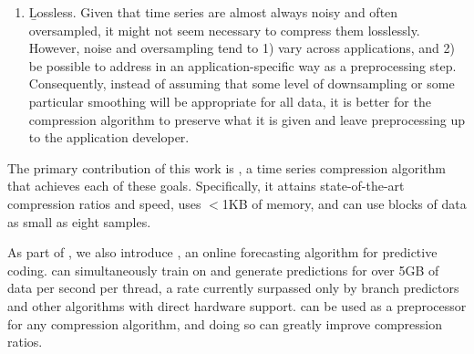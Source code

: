 \begin{enumerate}
\item \b{Lossless}. Given that time series are almost always noisy and often oversampled, it might not seem necessary to compress them losslessly. However, noise and oversampling tend to 1) vary across applications, and 2) be possible to address in an application-specific way as a preprocessing step. Consequently, instead of assuming that some level of downsampling or some particular smoothing will be appropriate for all data, it is better for the compression algorithm to preserve what it is given and leave preprocessing up to the application developer.
\end{enumerate}

The primary contribution of this work is \mine,
a time series compression algorithm that achieves each of these goals. Specifically, it attains state-of-the-art compression ratios and speed, uses $<$1KB of memory, and can use blocks of data as small as eight samples.

As part of \mine, we also introduce \fire,
an online forecasting algorithm for predictive coding. \fire can simultaneously train on and generate predictions for over 5GB of data per second per thread, a rate currently surpassed only by branch predictors and other algorithms with direct hardware support. \fire can be used as a preprocessor for any compression algorithm, and doing so can greatly improve compression ratios.





